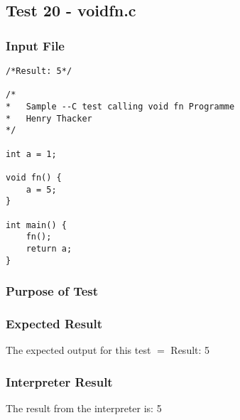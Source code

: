 \subsection{Test 20 - voidfn.c}
\subsubsection{Input File}
\begin{lstlisting}[showstringspaces=false,breaklines=true,backgroundcolor=\color{light-gray}, captionpos=b]
/*Result: 5*/

/*
*	Sample --C test calling void fn Programme
*	Henry Thacker
*/

int a = 1;

void fn() {
	a = 5;
}

int main() {
	fn();
	return a;
}
\end{lstlisting}\subsubsection{Purpose of Test}

\subsubsection{Expected Result}
The expected output for this test $=$ Result: 5
\subsubsection{Interpreter Result}
The result from the interpreter is: 5
